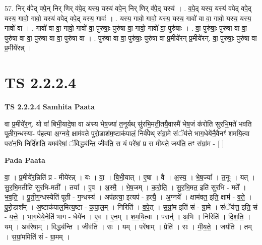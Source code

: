 \documentclass[17pt]{extarticle}
\begin{document}
57. निर् व॑पेद् वपे॒न् निर् णिर् व॑पे॒द् यस्य॒ यस्य॑ वपे॒न् निर् णिर् व॑पे॒द् यस्य॑ । . व॒पे॒द् यस्य॒ यस्य॑ वपेद् वपे॒द् यस्य॒ गावो॒ गावो॒ यस्य॑ वपेद् वपे॒द् यस्य॒ गावः॑ । . यस्य॒ गावो॒ गावो॒ यस्य॒ यस्य॒ गावो॑ वा वा॒ गावो॒ यस्य॒ यस्य॒ गावो॑ वा । . गावो॑ वा वा॒ गावो॒ गावो॑ वा॒ पुरु॑षाः॒ पुरु॑षा वा॒ गावो॒ गावो॑ वा॒ पुरु॑षाः । . वा॒ पुरु॑षाः॒ पुरु॑षा वा वा॒ पुरु॑षा वा वा॒ पुरु॑षा वा वा॒ पुरु॑षा वा । . पुरु॑षा वा वा॒ पुरु॑षाः॒ पुरु॑षा वा प्र॒मीये॑रन् प्र॒मीये॑रन्. वा॒ पुरु॑षाः॒ पुरु॑षा वा प्र॒मीये॑रन्न् । \newline
\pagebreak
{}
\section*{ TS 2.2.2.4 }

\textbf{TS 2.2.2.4 } \newline
\textbf{Samhita Paata} \newline

वा प्र॒मीये॑र॒न्. यो वा॑ बिभी॒यादे॒षा वा अ॑स्य भेष॒ज्या॑ त॒नूर्यथ् सु॑रभि॒मती॒तयै॒वास्मै॑ भेष॒जं क॑रोति सुरभि॒मते॑ भवति पूतीग॒न्धस्या- प॑हत्या अ॒ग्नये॒ क्षाम॑वते पुरो॒डाश॑म॒ष्टाक॑पालं॒ निर्व॑पेथ् संग्रा॒मे संॅय॑त्ते भाग॒धेये॑नै॒वैनꣳ॑ शमयि॒त्वा परा॑न॒भि निर्दि॑शति॒ यमव॑रेषां॒ ॅविद्ध्य॑न्ति॒ जीव॑ति॒ स यं परे॑षां॒ प्र स मी॑यते॒ जय॑ति॒ तꣳ स॑ग्रां॒म - [  ] \newline

\textbf{Pada Paata} \newline

वा॒ । प्र॒मीये॑र॒न्निति॑ प्र - मीये॑रन्न् । यः । वा॒ । बि॒भी॒यात् । ए॒षा । वै । अ॒स्य॒ । भे॒ष॒ज्या᳚ । त॒नूः । यत् । सु॒र॒भि॒मतीति॑ सुरभि-मती᳚ । तया᳚ । ए॒व । अ॒स्मै॒ । भे॒ष॒जम् । क॒रो॒ति॒ । सु॒र॒भि॒मत॒ इति॑ सुरभि - मते᳚ । भ॒व॒ति॒ । पू॒ती॒ग॒न्धस्येति॑ पूती - ग॒न्धस्य॑ । अप॑हत्या॒ इत्यप॑ - ह॒त्यै॒ । अ॒ग्नये᳚ । क्षाम॑वत॒ इति॒ क्षाम॑ - व॒ते॒ । पु॒रो॒डाश᳚म् । अ॒ष्टाक॑पाल॒मित्य॒ष्टा - क॒पा॒ल॒म् । निरिति॑ । व॒पे॒त् । स॒ग्रां॒म इति॑ सं - ग्रा॒मे । संॅय॑त्त॒ इति॒ सं - य॒त्ते॒ । भा॒ग॒धेये॒नेति॑ भाग - धेये॑न । ए॒व । ए॒न॒म् । श॒म॒यि॒त्वा । परान्॑ । अ॒भि । निरिति॑ । दि॒श॒ति॒ । यम् । अव॑रेषाम् । विद्ध्य॑न्ति । जीव॑ति । सः । यम् । परे॑षाम् । प्रेति॑ । सः । मी॒य॒ते॒ । जय॑ति । तम् । स॒ग्रां॒ममिति॑ सं - ग्रा॒मम् ।  \newline
\end{document}
